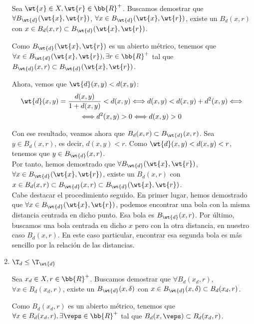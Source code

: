 \begin{ejercicio}
\begin{enumerate}
        Sea $\wt{x}\in X, \wt{r}\in \bb{R}^+$. Buscamos demostrar que $\forall B_{\wt{d}}(\wt{x}, \wt{r})$, $\forall x\in B_{\wt{d}}(\wt{x}, \wt{r})$, existe un $B_d(x,r)$ con $x\in B_d(x,r)\subset B_{\wt{d}}(\wt{x}, \wt{r})$.

        Como $B_{\wt{d}}(\wt{x}, \wt{r})$ es un abierto métrico, tenemos que $\forall x\in B_{\wt{d}}(\wt{x}, \wt{r}), \exists r\in \bb{R}^+$ tal que $B_{\wt{d}}(x,r)\subset B_{\wt{d}}(\wt{x}, \wt{r})$.

        Ahora, vemos que $\wt{d}(x,y)<d(x,y)$:
        \begin{multline*}
            \wt{d}(x,y) = \frac{d(x,y)}{1+d(x,y)}<d(x,y) 
            \Longleftrightarrow 
            d(x,y)<d(x,y) + d^2(x,y)
            \Longleftrightarrow\\\Longleftrightarrow  d^2(x,y)>0 \Longleftrightarrow d(x,y)>0
        \end{multline*}
        
        Con ese resultado, veamos ahora que $B_d(x,r)\subset B_{\wt{d}}(x,r)$. Sea $y\in B_d(x,r)$, es decir, $d(x,y)<r$. Como $\wt{d}(x,y)<d(x,y)<r$, tenemos que $y\in B_{\wt{d}}(x,r)$.\\

        Por tanto, hemos demostrado que $\forall B_{\wt{d}}(\wt{x}, \wt{r})$, $\forall x\in B_{\wt{d}}(\wt{x}, \wt{r})$, existe un $B_d(x,r)$ con $x\in B_d(x,r)\subset B_{\wt{d}}(x, r)\subset B_{\wt{d}}(\wt{x}, \wt{r})$.\\

        Cabe destacar el procedimiento seguido. En primer lugar, hemos demostrado que $\forall x\in B_{\wt{d}}(\wt{x}, \wt{r})$, podemos encontrar una bola con la misma distancia centrada en dicho punto. Esa bola es $B_{\wt{d}}(x, r)$. Por último, buscamos una bola centrada en dicho $x$ pero con la otra distancia, en nuestro caso $B_d(x,r)$. En este caso particular, encontrar esa segunda bola es más sencillo por la relación de las distancias.

        \item \ul{$\T_d\leq \T_{\wt{d}}$}

        Sea $x_d\in X, r\in \bb{R}^+$. Buscamos demostrar que $\forall B_{d}(x_d, r)$, $\forall x\in B_{d}(x_d, r)$, existe un $B_{\wt{d}}(x,\delta)$ con $x\in B_{\wt{d}}(x,\delta)\subset B_{d}(x_d, r)$.

        Como $B_{d}(x_d, r)$ es un abierto métrico, tenemos que $\forall x\in B_{d}(x_d, r), \exists \veps\in \bb{R}^+$ tal que $B_{d}(x,\veps)\subset B_{d}(x_d, r)$.


\end{enumerate}
\end{ejercicio}
